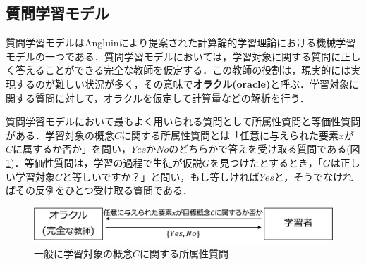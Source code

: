 \subsection{質問学習モデル}
質問学習モデルはAngluin\cite{angluin-ml1988}により提案された計算論的学習理論における機械学習モデルの一つである．質問学習モデルにおいては，学習対象に関する質問に正しく答えることができる完全な教師を仮定する．この教師の役割は，現実的には実現するのが難しい状況が多く，その意味で\textbf{オラクル(oracle)}と呼ぶ．学習対象に関する質問に対して，オラクルを仮定して計算量などの解析を行う．

質問学習モデルにおいて最もよく用いられる質問として所属性質問と等価性質問がある．学習対象の概念$C$に関する所属性質問とは「任意に与えられた要素$x$が$C$に属するか否か」を問い，$Yes$か$No$のどちらかで答えを受け取る質問である(図\ref{fig:ql})．等価性質問は，学習の過程で生徒が仮説$G$を見つけたとするとき，「$G$は正しい学習対象$C$と等しいですか？」と問い，もし等しければ$Yes$と，そうでなければその反例をひとつ受け取る質問である．

\begin{figure}[tb]
  \centering
  \includegraphics[scale=0.28]{fig/fig-ql.eps}
  \caption{一般に学習対象の概念$C$に関する所属性質問}\label{fig:ql}
\end{figure}